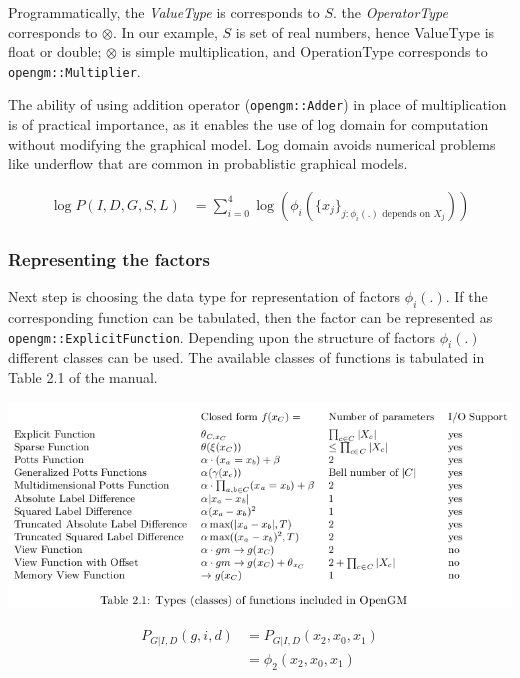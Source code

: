 \documentclass[12pt,oneside,letterpaper]{article}
\begin{document}
Programmatically, the \emph{ValueType} is corresponds to $S$. the
\emph{OperatorType} corresponds to $\otimes$.  In our example, $S$ is set of real numbers, hence ValueType is float or double;
$\otimes$ is simple multiplication, and OperationType corresponds to
\lstinline|opengm::Multiplier|.


The ability of using addition operator (\lstinline|opengm::Adder|) in place
of multiplication is of practical importance, as it enables the use of log
domain for computation without modifying the graphical model. Log domain avoids
numerical problems like underflow that are common in probablistic graphical models.


\begin{align}
  \log P(I, D, G, S, L) &= \sum_{i=0}^{4} \log( \phi_i(\{ x_j \}_{j : \phi_i(.) \text{ depends on } X_j}) )
  \label{eq:factorization}
\end{align}

\subsubsection{Representing the factors} 

Next step is choosing the data type for representation of factors $\phi_i(.)$.
If the corresponding function can be tabulated, then the factor can be
represented as \lstinline|opengm::ExplicitFunction|. Depending upon the structure of 
factors $\phi_i(.)$ different classes can be used. The available classes of
functions is tabulated in Table 2.1 of the manual.

\includegraphics[width=\textwidth, trim=0 0 0 0, clip]{media/availablefunctions.png}

\begin{align}
  P_{G|I,D}(g, i, d) &= P_{G|I,D}(x_2, x_0, x_1) \\
                     &= \phi_2(x_2, x_0, x_1)
\end{align}
\end{document}
